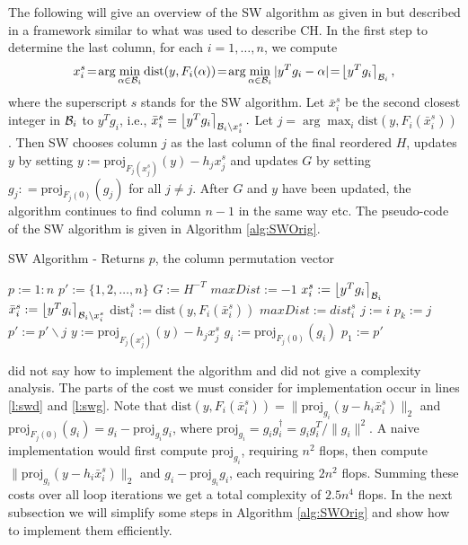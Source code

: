 \documentclass[conference]{IEEEtran}
\newcommand{\be}{\begin{equation}}
\newcommand{\ee}{\end{equation}}
\newcommand{\dist}{\mathrm{dist}}
\begin{document}
The following will give an overview of the SW algorithm as given in
\cite{SuW05} but described in a framework similar to what was used to describe
CH. In the first step to determine the last column, for each $i = 1, \dots, n$,
we compute 
\be
x_i^s \!=\! \arg\min_{\alpha\in {\cal B}_i}\dist(y,F_i(\alpha)) 
\!=\!  \arg\min _{\alpha\in {\cal B}_i}| y^Tg_i - \alpha | \!=\! \left \lfloor y^Tg_i \right \rceil_{{\cal B}_i},
\label{eq:xis}
\ee
where the superscript $s$  stands for the SW algorithm.
Let $\bar{x}_i^s$ be the second closest integer in ${{\cal B}_i }$ to $y^Tg_i$, i.e.,
$\bar{x}_i^s = \left \lfloor y^Tg_i \right \rceil_{{\cal B}_i\backslash x_i^s}.$
Let $j = \arg\max_i  \dist (y,F_i(\bar{x}_i^s))$. 
Then SW chooses column $j$ as the last column of the final reordered $H$,
 updates $y$ by setting 
$y:=\mbox{proj}_{F_j(x_j^s)}(y) -h_jx_j^s$  and 
updates $G$ by setting $ g_j: = \mbox{proj}_{F_j(0)}(g_j)$ for all $j\neq j$. 
After $G$ and $y$ have been updated, the algorithm continues to find column $n-1$ in the
same way etc. The pseudo-code of the SW algorithm is given in Algorithm \ref{alg:SWOrig}.
\begin{algorithm}
\caption{SW Algorithm - Returns $p$, the column permutation vector}
\label{alg:SWOrig}
\begin{algorithmic}[1]
\STATE $p := 1:n$
\STATE $p' := \{1, 2, \ldots, n\}$
\STATE \label{l:swG} $G := H^{-T}$ \hfill %
	\STATE $maxDist := -1$
		\STATE $x_i^s := \left \lfloor  y^Tg_i \right \rceil_{{\cal B }_i}$ \hfill%
		     \label{l:swx}
		\STATE $\bar{x}_i^s := \left \lfloor y^Tg_i \right \rceil_{{{\cal B }_i}{\backslash x_i^s}}$
		    \label{l:swbx}
		\STATE  \label{l:swd} $\dist_i^s := \dist(y,F_i(\bar{x}_i^s))$ %
			\STATE $maxDist := dist_i^s$
			\STATE $j := i$
		\ENDIF
	\ENDFOR
	\STATE $p_k := j$
	\STATE $p' := p' \backslash j$
	\STATE $y := \mbox{proj}_{F_j(x_j^s)}(y) -h_jx_j^s$  \label{l:swy}
		\STATE \label{l:swg} $g_i := \mbox{proj}_{F_j(0)}(g_i) $ %
	\ENDFOR
\ENDFOR
\STATE $p_1 := p'$
\end{algorithmic}
\end{algorithm}

 \cite{SuW05} did not say how to implement the algorithm and did not give a complexity analysis.
The parts of the cost we must consider for implementation occur in
lines \ref{l:swd} and \ref{l:swg}.
Note that $ \dist(y,F_i(\bar{x}_i^s))=\|\mbox{proj}_{g_i}(y-h_i\bar{x}_i^s)\|_2$
and $\mbox{proj}_{F_j(0)}(g_i)= g_i -\mbox{proj}_{g_i} g_i$,
where $\mbox{proj}_{g_i}=g_ig_i^\dag = g_ig_i^T/\|g_i\|^2$. 
A naive implementation would first compute $\mbox{proj}_{g_i}$, requiring $n^2$ flops, then compute 
$\|\mbox{proj}_{g_i}(y-h_i\bar{x}_i^s)\|_2$ and $g_i -\mbox{proj}_{g_i} g_i$, each requiring $2n^2$ flops.
Summing these costs over all loop iterations we get a total complexity of $2.5n^4$ flops.
In the next subsection we will simplify some steps in Algorithm \ref{alg:SWOrig}
and show how to  implement them efficiently.
\end{document}
